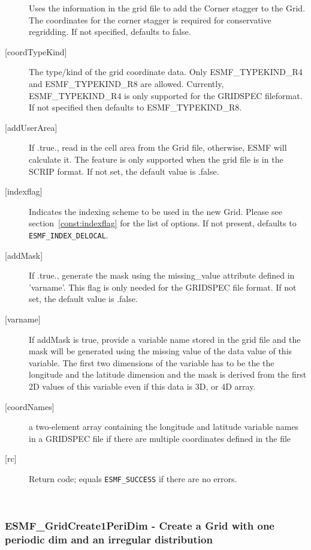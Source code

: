 \begin{description}
        Uses the information in the grid file to add the Corner stagger to
        the Grid. The coordinates for the corner stagger is required for conservative
        regridding. If not specified, defaults to false.
   \item[{[coordTypeKind]}]
            The type/kind of the grid coordinate data. Only ESMF\_TYPEKIND\_R4
            and ESMF\_TYPEKIND\_R8 are allowed.  Currently, ESMF\_TYPEKIND\_R4 is only
            supported for the GRIDSPEC fileformat. 
            If not specified then defaults to ESMF\_TYPEKIND\_R8.
   \item[{[addUserArea]}]
        If .true., read in the cell area from the Grid file, otherwise, ESMF will calculate it.  The feature
        is only supported when the grid file is in the SCRIP format.  If not set, the default value is
        .false.
   \item[{[indexflag]}]
        Indicates the indexing scheme to be used in the new Grid. Please see
        section~\ref{const:indexflag} for the list of options. If not present,
        defaults to {\tt ESMF\_INDEX\_DELOCAL}.
   \item[{[addMask]}]
        If .true., generate the mask using the missing\_value attribute defined in 'varname'. This flag
        is only needed for the GRIDSPEC file format.  If not set, the default value is .false.
   \item[{[varname]}]
        If addMask is true, provide a variable name stored in the grid file and
        the mask will be generated using the missing value of the data value of
        this variable.  The first two dimensions of the variable has to be the
        the longitude and the latitude dimension and the mask is derived from the
        first 2D values of this variable even if this data is 3D, or 4D array.
  \item[{[coordNames]}]
        a two-element array containing the longitude and latitude variable names in a
        GRIDSPEC file if there are multiple coordinates defined in the file
   \item[{[rc]}]
        Return code; equals {\tt ESMF\_SUCCESS} if there are no errors.
   \end{description}
   
 
\mbox{}\hrulefill\ 
 
\subsubsection [ESMF\_GridCreate1PeriDim] {ESMF\_GridCreate1PeriDim - Create a Grid with one periodic dim and an irregular distribution}


